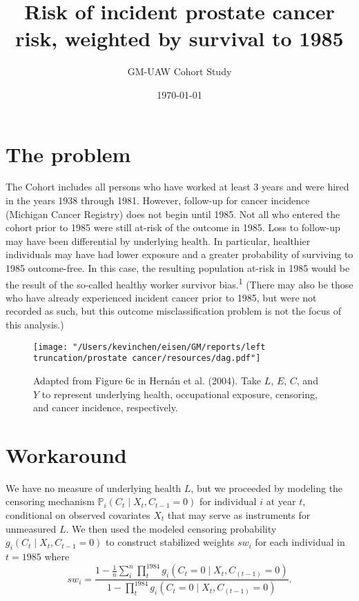 \documentclass[10pt,]{article}
\title{Risk of incident prostate cancer risk, weighted by survival to 1985}
\subtitle{GM-UAW Cohort Study}
\author{}
\date{\vspace{-2.5em}\today}
\begin{document}
\maketitle

\renewcommand\arraystretch{1.1}
\onehalfspacing

\hypertarget{the-problem}{%
\section{The problem}\label{the-problem}}

The Cohort includes all persons who have worked at least 3 years and
were hired in the years 1938 through 1981. However, follow-up for cancer
incidence (Michigan Cancer Registry) does not begin until 1985. Not all
who entered the cohort prior to 1985 were still at-risk of the outcome
in 1985. Loss to follow-up may have been differential by underlying
health. In particular, healthier individuals may have had lower exposure
and a greater probability of surviving to 1985 outcome-free. In this
case, the resulting population at-risk in 1985 would be the result of
the so-called healthy worker survivor bias.\textsuperscript{1} (There
may also be those who have already experienced incident cancer prior to
1985, but were not recorded as such, but this outcome misclassification
problem is not the focus of this analysis.)

\begin{figure}
\caption{Adapted from Figure 6c in Hernán et al. (2004). Take $L$, $E$, $C$, and $Y$ to represent underlying health, occupational exposure, censoring, and cancer incidence, respectively.}
\centering
\texttt{[image: "/Users/kevinchen/eisen/GM/reports/left truncation/prostate cancer/resources/dag.pdf"]}
\end{figure}

\hypertarget{workaround}{%
\section{Workaround}\label{workaround}}

We have no measure of underlying health \(L\), but we proceeded by
modeling the censoring mechanism
\(\mathbb P_{i}(C_t \mid X_t ,C_{t - 1} = 0)\) for individual \(i\) at
year \(t\), conditional on observed covariates \(X_t\) that may serve as
instruments for unmeasured \(L\). We then used the modeled censoring
probability \(g_i(C_t\mid X_t ,C_{t - 1} = 0)\) to construct stabilized
weights \(sw_i\) for each individual in \(t = 1985\) where
\[sw_i = \frac{1 - \frac{1}{n}\sum^n_i \mathbb \prod_t^{1984} g_i(C_{t}  = 0\mid X_{t} ,C_{(t - 1)} = 0)}{1 - \prod_t^{1984} g_i(C_{t}  = 0 \mid X_{t} ,C_{(t - 1)} = 0)}.\]
\end{document}
